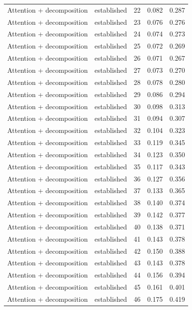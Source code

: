 \begin{tabular}{llrrr}
Attention + decomposition & established & 22 & 0.082 & 0.287 \\
Attention + decomposition & established & 23 & 0.076 & 0.276 \\
Attention + decomposition & established & 24 & 0.074 & 0.273 \\
Attention + decomposition & established & 25 & 0.072 & 0.269 \\
Attention + decomposition & established & 26 & 0.071 & 0.267 \\
Attention + decomposition & established & 27 & 0.073 & 0.270 \\
Attention + decomposition & established & 28 & 0.078 & 0.280 \\
Attention + decomposition & established & 29 & 0.086 & 0.294 \\
Attention + decomposition & established & 30 & 0.098 & 0.313 \\
Attention + decomposition & established & 31 & 0.094 & 0.307 \\
Attention + decomposition & established & 32 & 0.104 & 0.323 \\
Attention + decomposition & established & 33 & 0.119 & 0.345 \\
Attention + decomposition & established & 34 & 0.123 & 0.350 \\
Attention + decomposition & established & 35 & 0.117 & 0.343 \\
Attention + decomposition & established & 36 & 0.127 & 0.356 \\
Attention + decomposition & established & 37 & 0.133 & 0.365 \\
Attention + decomposition & established & 38 & 0.140 & 0.374 \\
Attention + decomposition & established & 39 & 0.142 & 0.377 \\
Attention + decomposition & established & 40 & 0.138 & 0.371 \\
Attention + decomposition & established & 41 & 0.143 & 0.378 \\
Attention + decomposition & established & 42 & 0.150 & 0.388 \\
Attention + decomposition & established & 43 & 0.143 & 0.378 \\
Attention + decomposition & established & 44 & 0.156 & 0.394 \\
Attention + decomposition & established & 45 & 0.161 & 0.401 \\
Attention + decomposition & established & 46 & 0.175 & 0.419 \\

\end{tabular}

